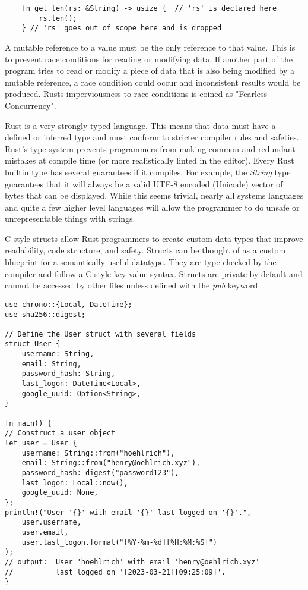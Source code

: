 \documentclass[12pt]{article}
\begin{document}
\begin{flushleft}
\begin{verbatim}
    fn get_len(rs: &String) -> usize {  // 'rs' is declared here
        rs.len();
    } // 'rs' goes out of scope here and is dropped
\end{verbatim}
\doublespacing{}

A mutable reference to a value must be the only reference to that value. This
is to prevent race conditions for reading or modifying data. If another part of
the program tries to read or modify a piece of data that is also being modified
by a mutable reference, a race condition could occur and inconsistent results
would be produced. Rusts imperviousness to race conditions is coined as
"Fearless Concurrency". 


Rust is a very strongly typed language. This means that data must have a
defined or inferred type and must conform to stricter compiler rules and
safeties. Rust's type system prevents programmers from making common and
redundant mistakes at compile time (or more realistically linted in the
editor). Every Rust builtin type has several guarantees if it compiles. For
example, the \textit{String} type guarantees that it will always be a valid
UTF-8 encoded (Unicode) vector of bytes that can be displayed. While this seems
trivial, nearly all systems languages and quite a few higher level languages
will allow the programmer to do unsafe or unrepresentable things with strings.


C-style structs allow Rust programmers to create custom data types that improve
readability, code structure, and safety. Structs can be thought of as a custom
blueprint for a semantically useful datatype. They are type-checked by the
compiler and follow a C-style key-value syntax. Structs are private by default
and cannot be accessed by other files unless defined with the \textit{pub}
keyword.

\singlespacing{}
\begin{verbatim}
use chrono::{Local, DateTime};
use sha256::digest;

// Define the User struct with several fields
struct User {
    username: String,
    email: String,
    password_hash: String,
    last_logon: DateTime<Local>,
    google_uuid: Option<String>,
}

fn main() {
// Construct a user object
let user = User {
    username: String::from("hoehlrich"),
    email: String::from("henry@oehlrich.xyz"),
    password_hash: digest("password123"),
    last_logon: Local::now(),
    google_uuid: None,
};
println!("User '{}' with email '{}' last logged on '{}'.",
    user.username,
    user.email,
    user.last_logon.format("[%Y-%m-%d][%H:%M:%S]")
);
// output:  User 'hoehlrich' with email 'henry@oehlrich.xyz'
//          last logged on '[2023-03-21][09:25:09]'.
}
\end{verbatim}
\doublespacing{}


\end{flushleft}
\end{document}
